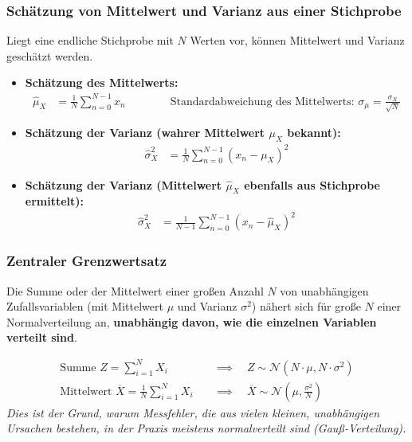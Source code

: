     \subsubsection{Schätzung von Mittelwert und Varianz aus einer Stichprobe}
        Liegt eine endliche Stichprobe mit $N$ Werten vor, können Mittelwert und Varianz geschätzt werden.
        \begin{itemize}
            \item \textbf{Schätzung des Mittelwerts:}
            \begin{align*}
                \hat{\mu}_X &= \frac{1}{N} \sum_{n=0}^{N-1} x_n \qquad \qquad \text{Standardabweichung des Mittelwerts: } \sigma_\mu = \frac{\sigma_X}{\sqrt{N}}
            \end{align*}
            \item \textbf{Schätzung der Varianz (wahrer Mittelwert $\mu_X$ bekannt):}
            \begin{align*}
                \hat{\sigma}_X^2 &= \frac{1}{N} \sum_{n=0}^{N-1} (x_n - \mu_X)^2
            \end{align*}
            \item \textbf{Schätzung der Varianz (Mittelwert $\hat{\mu}_X$ ebenfalls aus Stichprobe ermittelt):}
            \begin{align*}
                \hat{\sigma}_X^2 &= \frac{1}{N-1} \sum_{n=0}^{N-1} (x_n - \hat{\mu}_X)^2
            \end{align*}
        \end{itemize}

    \subsubsection{Zentraler Grenzwertsatz}
        Die Summe oder der Mittelwert einer großen Anzahl $N$ von unabhängigen Zufallsvariablen (mit Mittelwert $\mu$ und Varianz $\sigma^2$) nähert sich für große $N$ einer Normalverteilung an, \textbf{unabhängig davon, wie die einzelnen Variablen verteilt sind}.
        
        \begin{align*}
            \text{Summe } Z = \sum_{i=1}^{N} X_i \quad &\implies \quad Z \sim \mathcal{N}(N \cdot \mu, N \cdot \sigma^2) \\[1ex]
            \text{Mittelwert } \overline{X} = \frac{1}{N}\sum_{i=1}^{N} X_i \quad &\implies \quad \overline{X} \sim \mathcal{N}\left(\mu, \frac{\sigma^2}{N}\right)
        \end{align*}
        \textit{Dies ist der Grund, warum Messfehler, die aus vielen kleinen, unabhängigen Ursachen bestehen, in der Praxis meistens normalverteilt sind (Gauß-Verteilung).}


